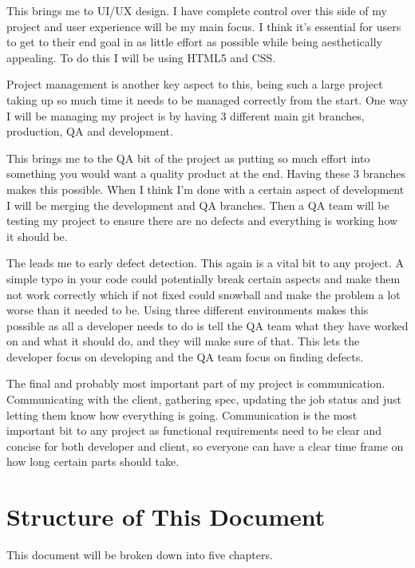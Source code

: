 This brings me to UI/UX design. I have complete control over this side of my project and user experience will be my main focus. I think it’s essential for users to get to their end goal in as little effort as possible while being aesthetically appealing. To do this I will be using HTML5 and CSS. 

Project management is another key aspect to this, being such a large project taking up so much time it needs to be managed correctly from the start. One way I will be managing my project is by having 3 different main git branches, production, QA and development. 

This brings me to the QA bit of the project as putting so much effort into something you would want a quality product at the end. Having these 3 branches makes this possible. When I think I’m done with a certain aspect of development I will be merging the development and QA branches. Then a QA team will be testing my project to ensure there are no defects and everything is working how it should be.

The leads me to early defect detection. This again is a vital bit to any project. A simple typo in your code could potentially break certain aspects and make them not work correctly which if not fixed could snowball and make the problem a lot worse than it needed to be. Using three different environments makes this possible as all a developer needs to do is tell the QA team what they have worked on and what it should do, and they will make sure of that. This lets the developer focus on developing and the QA team focus on finding defects. 

The final and probably most important part of my project is communication. Communicating with the client, gathering spec, updating the job status and just letting them know how everything is going. Communication is the most important bit to any project as functional requirements need to be clear and concise for both developer and client, so everyone can have a clear time frame on how long certain parts should take. 

\newpage
\section{Structure of This Document}
This document will be broken down into five chapters.

